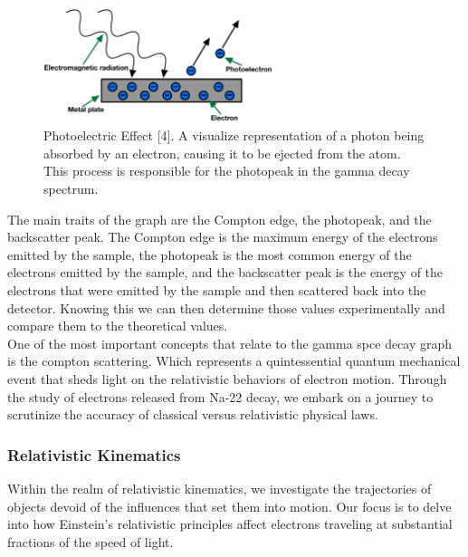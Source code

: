 \documentclass[12pt]{article}
\begin{document}
        \begin{figure}[]
                \centering
                \includegraphics[width=0.6\textwidth]{./img/other/photoeletric_effect.png}
                \caption{Photoelectric Effect [4].  A visualize representation of a photon being absorbed by an electron, causing it to be ejected from the atom. This process is responsible for the photopeak in the gamma decay spectrum.}
                \label{fig:Photoelectric Effect [4]}
        \end{figure}

        The main traits of the graph are the Compton edge, the photopeak, and the backscatter peak. 
        The Compton edge is the maximum energy of the electrons emitted by the sample, the photopeak is the most common 
        energy of the electrons emitted by the sample, and the backscatter peak is the energy of the electrons that were emitted 
        by the sample and then scattered back into the detector. Knowing this we can then determine those values experimentally 
        and compare them to the theoretical values.
        \\ 
        
        One of the most important concepts that relate to the gamma spce decay graph is the compton scattering. Which represents a 
        quintessential quantum mechanical event that sheds light on the relativistic 
        behaviors of electron motion. Through the study of electrons released from Na-22 decay, we embark on a journey 
        to scrutinize the accuracy of classical versus relativistic physical laws.
            
        \subsubsection{Relativistic Kinematics}
                Within the realm of relativistic kinematics, we investigate the trajectories of objects devoid of 
                the influences that set them into motion. Our focus is to delve into how Einstein's relativistic 
                principles affect electrons traveling at substantial fractions of the speed of light.
                
\end{document}
